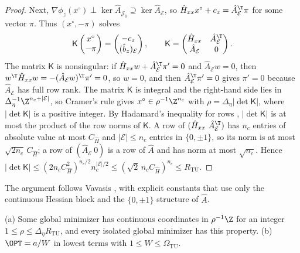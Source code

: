 \begin{proof}
Next, $\nabla\phi_z(x^\circ)\perp\ker\hat A_{\mathcal J_0}\supseteq\ker\hat A_{\mathcal E}$,
so $\hat H_{xx}x^\circ+c_z=\hat A_{\mathcal E}^{\T}\pi$ for some vector $\pi$.
Thus $(x^\circ,-\pi)$ solves
\[
\mathsf K\begin{pmatrix}x^\circ\\ -\pi\end{pmatrix}
=\begin{pmatrix}-c_z\\ (\hat b_z)_{\mathcal E}\end{pmatrix},\qquad
\mathsf K=\begin{pmatrix}\hat H_{xx}&\hat A_{\mathcal E}^{\T}\\ \hat A_{\mathcal E}&0\end{pmatrix}.
\]
The matrix $\mathsf K$ is nonsingular: if $\hat H_{xx}w+\hat A_{\mathcal E}^{\T}\pi'=0$
and $\hat A_{\mathcal E}w=0$, then $w^{\T}\hat H_{xx}w=-(\hat A_{\mathcal E}w)^{\T}\pi'=0$,
so $w=0$, and then $\hat A_{\mathcal E}^{\T}\pi'=0$ gives $\pi'=0$ because
$\hat A_{\mathcal E}$ has full row rank. The matrix $\mathsf K$ is integral and
the right-hand side lies in $\Delta_\eta^{-1}\Z^{n_c+\lvert\mathcal E\rvert}$,
so Cramer's rule gives $x^\circ\in\rho^{-1}\Z^{n_c}$ with
$\rho=\Delta_\eta\lvert\det\mathsf K\rvert$, where $\lvert\det\mathsf K\rvert$
is a positive integer. By Hadamard's inequality for rows
\cite{HornJohnson2013},
$\lvert\det\mathsf K\rvert$ is at most the product of the row norms of
$\mathsf K$. A row of
$(\hat H_{xx}\ \hat A_{\mathcal E}^{\T})$ has $n_c$ entries of absolute value at
most $C_{\hat H}$ and $\lvert\mathcal E\rvert\le n_c$ entries in $\{0,\pm1\}$,
so its norm is at most $\sqrt{2n_c}\,C_{\hat H}$; a row of
$(\hat A_{\mathcal E}\ 0)$ is a row of $\hat A$ and has norm at most
$\sqrt{n_c}$. Hence
$\lvert\det\mathsf K\rvert\le(2n_cC_{\hat H}^2)^{n_c/2}n_c^{\lvert\mathcal E\rvert/2}
\le(\sqrt2\,n_cC_{\hat H})^{n_c}\le R_{\mathrm{TU}}$.
\end{proof}

The argument follows Vavasis \cite{Vavasis1990}, with explicit
constants that use only the continuous Hessian block and the $\{0,\pm1\}$
structure of $\hat A$.

\begin{corollary}\label{cor:tu-height}
(a) Some global minimizer has continuous coordinates in $\rho^{-1}\Z$ for an
integer $1\le\rho\le\Delta_\eta R_{\mathrm{TU}}$, and every isolated global
minimizer has this property.
(b) $\OPT=a/W$ in lowest terms with $1\le W\le\Omega_{\mathrm{TU}}$.
\end{corollary}

